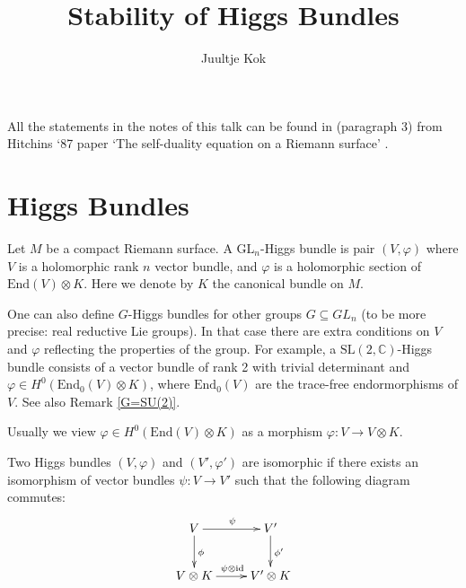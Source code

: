 

\title{Stability of Higgs Bundles}
\author{Juultje Kok}
\date{}

 
\maketitle

\begin{remark}
	All the statements in the notes of this talk can be found in (paragraph 3) from Hitchins `87 paper `The self-duality equation on a Riemann surface' \cite{Hitchin}.
\end{remark}

\section{Higgs Bundles}
\begin{definition}
    Let $M$ be a compact Riemann surface. A $\mathrm{GL}_n $-Higgs bundle is pair $(V, \varphi)$ where $ V$ is a holomorphic rank $n$ vector bundle, and $ \varphi$ is a holomorphic section of $ \mathrm{End}(V) \otimes K $. Here we denote by $K$ the canonical bundle on $M$. 
\end{definition}

One can also define $G$-Higgs bundles for other groups $G \subseteq GL_n$ (to be more precise: real reductive Lie groups). In that case there are extra conditions on $V$ and $\varphi$ reflecting the properties of the group. For example, a $\mathrm{SL}(2,\mathbb{C})$-Higgs bundle consists of a vector bundle of rank 2 with trivial determinant and $\varphi \in H^0(\mathrm{End}_0(V)\otimes K)$, where $\mathrm{End}_0(V)$ are the trace-free endormorphisms of $V$. See also Remark \ref{G=SU(2)}.
\begin{remark}
Usually we view $\varphi \in H^0 ( \mathrm{End} (V) \otimes K)$ as a morphism $\varphi: V \rightarrow V \otimes K$.
\end{remark}

\begin{definition}
    Two Higgs bundles $(V, \varphi) $ and $(V', \varphi')$ are isomorphic if 
    there exists an isomorphism of vector bundles $ \psi: V \rightarrow  V'$ such that the following diagram commutes: 
    \[
    \begin{xymatrix}{
    V \ar[d]^{\phi}\ar[r]^{\psi}&V' \ar[d]^{\phi'}\\
    V\otimes K \ar[r]^{\psi\otimes\mathrm{id}}&V'\otimes K
	}\end{xymatrix}
    \]
\end{definition}

